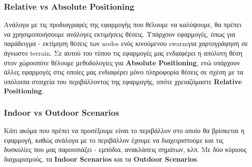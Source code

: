 \subsubsection{Relative vs Absolute Positioning}
Ανάλογα με τις προδιαγραφές της εφαρμογής που θέλουμε να καλύψουμε, θα πρέπει να χρησιμοποιήσουμε ανάλογες εκτιμήσεις θέσεις.
Υπάρχουν εφαρμογές, όπως για παράδειγμα - εκτίμηση θέσεις των nodes ενός κινούμενου swarm\udot για χαρτογράφηση σε άγνωστο terrain. Σε αυτού 
του τύπου τις εφαρμογές μας ενδιαφέρει η απόλυτη θέση στον χώρο\udot οπότε θέλουμε μεθοδολογίες για \textbf{Absolute Positioning}, ενώ 
υπάρχουν άλλες εφαρμογές στις οποίες μας ενδιαφέρει μόνο πληροφορία θέσεις σε σχέση με τα υπόλοιπα στοιχεία του περιβάλλοντος της
εφαρμογής, οπότε χρειαζόμαστε \textbf{Relative Positioning}.

\subsubsection{Indoor vs Outdoor Scenarios}
Κάτι ακόμα που πρέπει να προσέξουμε είναι το περιβάλλον στο οποίο θα βρίσκεται η εφαρμογή, καθώς ανάλογα με το περιβάλλον\udot
έχουμε να διαχειριστούμε και τις δυσκολίες που μας παρουσιάζει - εμπόδια, ανακλάσεις σημάτων, κλπ. Με δύο κύριους διαχωρισμούς,
τα \textbf{Indoor Scenarios} και τα \textbf{Outdoor Scenarios}.

